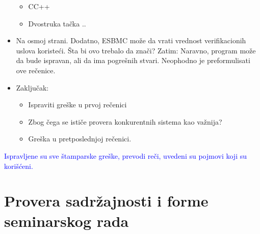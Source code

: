 \documentclass[a4paper]{report}
\newcommand{\odgovor}[1]{\textcolor{blue}{#1}}
\begin{document}
\begin{itemize}
\begin{itemize}
\item CC++
\item Dvostruka tačka ..
\end{itemize}
\item Na osmoj strani. Dodatno, ESBMC može da vrati vrednost verifikacionih uslova koristeći.
Šta bi ovo trebalo da znači? Zatim: Naravno, program može da bude ispravan, ali da ima pogrešnih stvari.
Neophodno je preformulisati ove rečenice.
\item Zaključak:
\begin{itemize}
\item Ispraviti greške u prvoj rečenici
\item Zbog čega se ističe provera konkurentnih sistema kao važnija?
\item Greška u pretposlednjoj rečenici.
\end{itemize}
\end{itemize}

\odgovor{Ispravljene su sve štamparske greške, prevodi reči, uvedeni su pojmovi koji su korišćeni.}

\section{Provera sadržajnosti i forme seminarskog rada}
\end{document}
